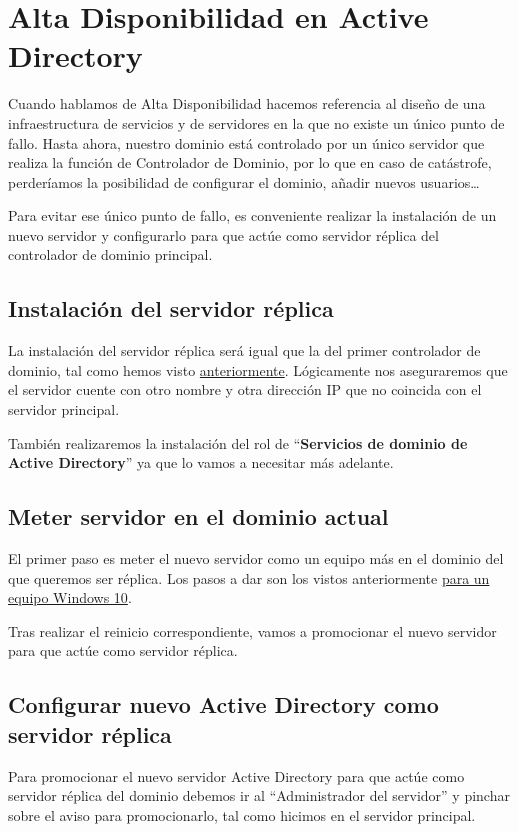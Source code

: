 

\chapter{Alta Disponibilidad en Active Directory}
Cuando hablamos de Alta Disponibilidad hacemos referencia al diseño de una infraestructura de servicios y de servidores en la que no existe un único punto de fallo. Hasta ahora, nuestro dominio está controlado por un único servidor que realiza la función de Controlador de Dominio, por lo que en caso de catástrofe, perderíamos la posibilidad de configurar el dominio, añadir nuevos usuarios…

Para evitar ese único punto de fallo, es conveniente realizar la instalación de un nuevo servidor y configurarlo para que actúe como servidor réplica del controlador de dominio principal.


\section{Instalación del  servidor réplica}
La instalación del servidor réplica será igual que la del primer controlador de dominio, tal como hemos visto \hyperlink{instalar_windows_server}{anteriormente}. Lógicamente nos aseguraremos que el servidor cuente con otro nombre y otra dirección IP que no coincida con el servidor principal.

También realizaremos la instalación del rol de “\textbf{Servicios de dominio de Active Directory}” ya que lo vamos a necesitar más adelante.

\section{Meter servidor en el dominio actual}
El primer paso es meter el nuevo servidor como un equipo más en el dominio del que queremos ser réplica. Los pasos a dar son los vistos anteriormente \hyperlink{pasos_previos_windows_cliente}{para un equipo Windows 10}.

Tras realizar el reinicio correspondiente, vamos a promocionar el nuevo servidor para que actúe como servidor réplica.


\section{Configurar nuevo Active Directory como servidor réplica}
Para promocionar el nuevo servidor Active Directory para que actúe como servidor réplica del dominio debemos ir al “Administrador del servidor” y pinchar sobre el aviso para promocionarlo, tal como hicimos en el servidor principal.

